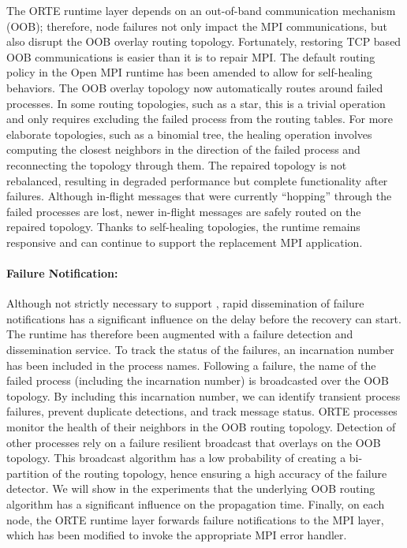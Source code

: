 The ORTE runtime layer depends on an out-of-band communication mechanism
(OOB); therefore, node failures not only impact the MPI communications,
but also disrupt the OOB overlay routing topology. Fortunately,
restoring TCP based OOB communications is easier than it is to repair
MPI. The default routing policy in the Open MPI runtime has been amended
to allow for self-healing behaviors. The OOB overlay topology now
automatically routes around failed processes. In some routing
topologies, such as a star, this is a trivial operation and only
requires excluding the failed process from the routing tables. For more
elaborate topologies, such as a binomial tree, the healing operation
involves computing the closest neighbors in the direction of the failed
process and reconnecting the topology through them. The repaired
topology is not rebalanced, resulting in degraded performance but
complete functionality after failures. Although in-flight messages that
were currently ``hopping'' through the failed processes are lost, newer
in-flight messages are safely routed on the repaired topology. Thanks to
self-healing topologies, the runtime remains responsive and can continue
to support the replacement MPI application.

\paragraph*{Failure Notification:} Although not strictly necessary to 
support \cof, rapid dissemination of failure notifications has a significant 
influence on the delay before the recovery can start. The runtime has 
therefore been augmented with a failure detection and dissemination 
service. To track the status of the failures, an
incarnation number has been included in the process names. Following a
failure, the name of the failed process (including the incarnation
number) is broadcasted over the OOB topology. By including this
incarnation number, we can identify transient process failures, prevent
duplicate detections, and track message status. ORTE processes monitor
the health of their neighbors in the OOB routing topology. Detection of
other processes rely on a failure resilient broadcast that overlays on
the OOB topology. This broadcast algorithm has a low probability of creating a
bi-partition of the routing topology, hence ensuring a high accuracy of
the failure detector. We will show in the experiments that the underlying 
OOB routing algorithm has a significant influence on the propagation
time. Finally, on each node, the ORTE runtime layer forwards
failure notifications to the MPI layer, which has been modified to
invoke the appropriate MPI error handler.
